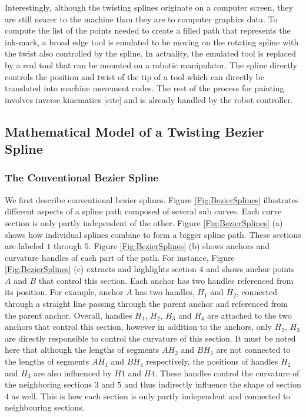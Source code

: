     Interestingly, although the twisting splines originate on a computer screen, they are still nearer to the machine than they are to computer graphics data. To compute the list of the points needed to create a filled path that represents the ink-mark, a broad edge tool is emulated to be moving on the rotating spline with the twist also controlled by the spline. In actuality, the emulated tool is replaced by a real tool that can be mounted on a robotic manipulator. The spline directly controls the position and twist of the tip of a tool which can directly be translated into machine movement codes. The rest of the process for painting involves inverse kinematics [cite] and is already handled by the robot controller.

    \subsection{Mathematical Model of a Twisting Bezier Spline}
    \subsubsection{The Conventional Bezier Spline}
         We first describe conventional bezier splines. Figure \ref{Fig:BezierSplines} illustrates different aspects of a spline path composed of several sub curves. Each curve section is only partly independent of the other. Figure \ref{Fig:BezierSplines} (a) shows how individual splines combine to form a bigger spline path. These sections are labeled $1$ through $5$. Figure \ref{Fig:BezierSplines} (b) shows anchors and curvature handles of each part of the path. For instance, Figure \ref{Fig:BezierSplines} (c) extracts and highlights section $4$ and shows anchor points $A$ and $B$ that control this section. Each anchor has two handles referenced from its position. For example, anchor $A$ has two handles, $H_1$ and $H_2$, connected through a straight line passing through the parent anchor and referenced from the parent anchor. Overall, handles $H_1$, $H_2$, $H_3$ and $H_4$ are attached to the two anchors that control this section, however in addition to the anchors, only $H_2$, $H_3$ are directly responsible to control the curvature of this section. It must be noted here that although the lengths of segments $\overline{AH_2}$ and $\overline{BH_3}$ are not connected to the lengths of segments $\overline{AH_1}$ and $\overline{BH_4}$ respectively, the positions of handles $H_2$ and $H_3$ are also influenced by $H1$ and $H4$. These handles control the curvature of the neighboring sections $3$ and $5$ and thus indirectly influence the shape of section $4$ as well. This is how each section is only partly independent and connected to neighbouring sections.



